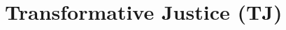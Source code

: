 \documentclass{article}
\begin{document}




    \section{Transformative Justice (TJ)}
        \label{transformative-justice}
\end{document}

